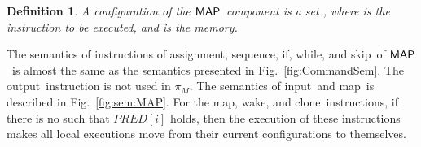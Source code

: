 \documentclass[10pt,a4paper,oneside]{article}
\newtheorem{definition}{Definition}[section]
\def\constructV#1#2{\ensuremath{\ouvd[#2\mapsto#1]}}
\def\substitute#1#2#3{\ensuremath{#1[#2\mapsto#3]}}
\def\signal{\ensuremath{signal}}
\def\ProgM{\ensuremath{\Prog_{M}}}
\def\sE{\textbf{E}}
\def\sS{\textbf{S}}
\def\ST{{\ensuremath{EX}}}
\def\TOP{\ensuremath{TOP}}
\def\ouvd{\ensuremath{\vec{\bot}}}
\def\chnl{\ensuremath{c}}
\def\NIL{\ensuremath{\bot}}
\def\ACCORCIA{\vspace*{-\baselineskip}}
\def\lcomma{\ensuremath{\!\!:\!\!}}
\def\sanserif#1{\ensuremath{\sf #1}}
\def\MAP{\ensuremath{\sanserif{MAP}}}
\def\Prog{\ensuremath{\pi}}
\def\comm{\ensuremath{\pi}}
\def\commM{\ensuremath{\comm_M}}
\def\Iid{\ensuremath{I}}
\def\LabelRule#1#2#3{\ensuremath{{\inferrule*[Left={#1}]{#2}{#3}}}}
\def\RINPM{INPM}
\def\RMAP{MAP}
\def\RCLONE{CLON}
\def\RWAKE{WAKM}
\def\NASSG{assignment}
\def\NCOMP{sequence}
\def\NIF{if}
\def\NWHILE{while}
\def\NSKIP{skip}
\def\NINPUT{input}
\def\NOUTPUT{output}
\def\NMAP{map}
\def\NCLONE{clone}
\def\NWAKE{wake}
\def\iclone#1#2#3{\ensuremath{\textbf{\NCLONE}(#1,#2,#3)}}
\def\NPRED{\ensuremath{PRED}}
\def\emptyPlace{\ensuremath{[\ ]}}
\def\PREDD{\ensuremath{\NPRED\emptyPlace}}
\def\PREDE#1{\ensuremath{\NPRED[#1]}}
\def\lprogm{{\sf prg}}
\def\lmemm{{\sf \ensuremath{mem}}}
\def\linput{{\sf in}}
\def\LECS{{\sf \ensuremath{LECS}}}
\def\litr{{\sf int}}
\def\lmap{{\sf map}}
\def\lstate{{\sf stt}}
\def\tcolm{\ensuremath{PRIV_{T_M}}}
\def\tcolr{\ensuremath{PRIV_{T_R}}}
\begin{document}
\begin{definition}\label{def:confMAP}
A configuration of the \MAP\ component is a set , where  is the instruction to be executed, and  is the memory.
\end{definition}

The semantics of instructions of \NASSG, \NCOMP, \NIF, \NWHILE, and \NSKIP\ of \MAP\ is almost the same as the semantics presented in Fig.~\ref{fig:CommandSem}. The \NOUTPUT\ instruction is not used in \ProgM. The semantics of \NINPUT\ and \NMAP\ is described in Fig.~\ref{fig:sem:MAP}. For the \NMAP, \NWAKE, and \NCLONE\ instructions, if there is no  such that \PREDE{i} holds, then the execution of these instructions makes all local executions move from their current configurations to themselves.

\begin{figure}[!t]
\begin{center}
\ACCORCIA
{}
\end{center}
\end{figure}
\end{document}
